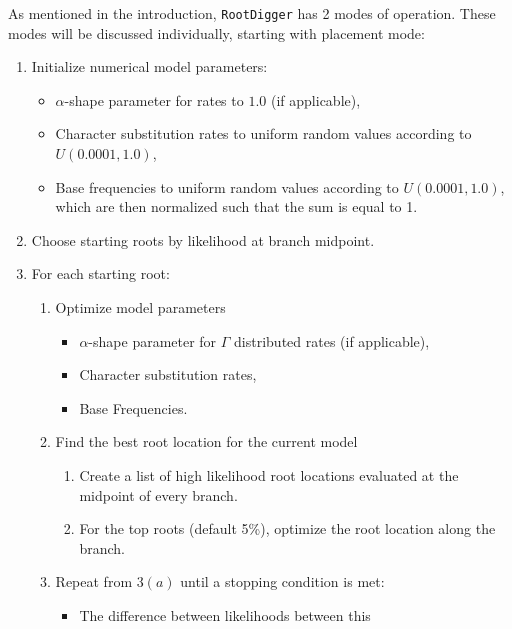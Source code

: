 \documentclass{article}
\newcommand{\RootDiggertt}{\texttt{RootDigger}}
\begin{document}
As mentioned in the introduction, \RootDiggertt{} has 2 modes of operation.
These modes will be discussed individually, starting with placement mode:

\begin{enumerate}
  \item Initialize numerical model parameters:
        \begin{itemize}
          \item $\alpha$-shape parameter for rates to $1.0$ (if applicable),
          \item Character substitution rates to uniform random values according
                to $U(0.0001, 1.0)$,
          \item Base frequencies to uniform random values according to
                $U(0.0001, 1.0)$, which are then normalized such that the sum is
                equal to 1.
        \end{itemize}
  \item Choose starting roots by likelihood at branch midpoint.
  \item For each starting root:
        \begin{enumerate}
          \item Optimize model parameters
                \begin{itemize}
                  \item $\alpha$-shape parameter for $\Gamma$ distributed rates
                    (if applicable),
                  \item Character substitution rates,
                  \item Base Frequencies.
                \end{itemize}
          \item Find the best root location for the current model
                \begin{enumerate}
                  \item Create a list of high likelihood root locations
                        evaluated at the midpoint of every branch.
                  \item For the top roots (default 5\%), optimize the root
                        location along the branch.
                \end{enumerate}
          \item Repeat from $3(a)$ until a stopping condition is met:
                \begin{itemize}
                  \item The difference between likelihoods between this

\end{itemize}
\end{enumerate}
\end{enumerate}
\end{document}
